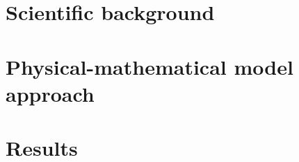\documentclass[
oneside,
a4paper,
12pt,
titlepage]
{article}
\begin{document}

\newpage

\newpage

\newpage
\pagestyle{standard}
\setcounter{table}{0} %
\renewcommand{\thetable}{\arabic{table}} %


\section{Scientific background}



\section{Physical-mathematical model approach}


\section{Results}


\newpage

\end{document}
